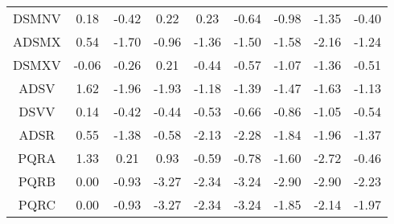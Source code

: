 \begin{longtable}{ | c || c | c | c | c | c | c | c || c |}
DSMNV &  \cellcolor[HTML]{F7F7FF} 0.18 &  \cellcolor[HTML]{FFF7F7} -0.42 &  \cellcolor[HTML]{F7F7FF} 0.22 &  \cellcolor[HTML]{F7F7FF} 0.23 &  \cellcolor[HTML]{FFEFEF} -0.64 &  \cellcolor[HTML]{FFE7E7} -0.98 &  \cellcolor[HTML]{FFDFDF} -1.35 &  \cellcolor[HTML]{FFF7F7} -0.40 \\
ADSMX &  \cellcolor[HTML]{EFEFFF} 0.54 &  \cellcolor[HTML]{FFD7D7} -1.70 &  \cellcolor[HTML]{FFE7E7} -0.96 &  \cellcolor[HTML]{FFDFDF} -1.36 &  \cellcolor[HTML]{FFD7D7} -1.50 &  \cellcolor[HTML]{FFD7D7} -1.58 &  \cellcolor[HTML]{FFC7C7} -2.16 &  \cellcolor[HTML]{FFDFDF} -1.24 \\
DSMXV &  \cellcolor[HTML]{FFFFFF} -0.06 &  \cellcolor[HTML]{FFF7F7} -0.26 &  \cellcolor[HTML]{F7F7FF} 0.21 &  \cellcolor[HTML]{FFF7F7} -0.44 &  \cellcolor[HTML]{FFEFEF} -0.57 &  \cellcolor[HTML]{FFE7E7} -1.07 &  \cellcolor[HTML]{FFDFDF} -1.36 &  \cellcolor[HTML]{FFEFEF} -0.51 \\
ADSV &  \cellcolor[HTML]{D7D7FF} 1.62 &  \cellcolor[HTML]{FFCFCF} -1.96 &  \cellcolor[HTML]{FFCFCF} -1.93 &  \cellcolor[HTML]{FFDFDF} -1.18 &  \cellcolor[HTML]{FFDFDF} -1.39 &  \cellcolor[HTML]{FFD7D7} -1.47 &  \cellcolor[HTML]{FFD7D7} -1.63 &  \cellcolor[HTML]{FFDFDF} -1.13 \\
DSVV &  \cellcolor[HTML]{FFFFFF} 0.14 &  \cellcolor[HTML]{FFF7F7} -0.42 &  \cellcolor[HTML]{FFF7F7} -0.44 &  \cellcolor[HTML]{FFEFEF} -0.53 &  \cellcolor[HTML]{FFEFEF} -0.66 &  \cellcolor[HTML]{FFE7E7} -0.86 &  \cellcolor[HTML]{FFE7E7} -1.05 &  \cellcolor[HTML]{FFEFEF} -0.54 \\
ADSR &  \cellcolor[HTML]{EFEFFF} 0.55 &  \cellcolor[HTML]{FFDFDF} -1.38 &  \cellcolor[HTML]{FFEFEF} -0.58 &  \cellcolor[HTML]{FFC7C7} -2.13 &  \cellcolor[HTML]{FFC7C7} -2.28 &  \cellcolor[HTML]{FFCFCF} -1.84 &  \cellcolor[HTML]{FFCFCF} -1.96 &  \cellcolor[HTML]{FFDFDF} -1.37 \\
PQRA &  \cellcolor[HTML]{DFDFFF} 1.33 &  \cellcolor[HTML]{F7F7FF} 0.21 &  \cellcolor[HTML]{E7E7FF} 0.93 &  \cellcolor[HTML]{FFEFEF} -0.59 &  \cellcolor[HTML]{FFEFEF} -0.78 &  \cellcolor[HTML]{FFD7D7} -1.60 &  \cellcolor[HTML]{FFB7B7} -2.72 &  \cellcolor[HTML]{FFF7F7} -0.46 \\
PQRB &  \cellcolor[HTML]{FFFFFF} 0.00 &  \cellcolor[HTML]{FFE7E7} -0.93 &  \cellcolor[HTML]{FFAFAF} -3.27 &  \cellcolor[HTML]{FFC7C7} -2.34 &  \cellcolor[HTML]{FFAFAF} -3.24 &  \cellcolor[HTML]{FFB7B7} -2.90 &  \cellcolor[HTML]{FFB7B7} -2.90 &  \cellcolor[HTML]{FFC7C7} -2.23 \\
PQRC &  \cellcolor[HTML]{FFFFFF} 0.00 &  \cellcolor[HTML]{FFE7E7} -0.93 &  \cellcolor[HTML]{FFAFAF} -3.27 &  \cellcolor[HTML]{FFC7C7} -2.34 &  \cellcolor[HTML]{FFAFAF} -3.24 &  \cellcolor[HTML]{FFCFCF} -1.85 &  \cellcolor[HTML]{FFC7C7} -2.14 &  \cellcolor[HTML]{FFCFCF} -1.97 \\

\end{longtable}
